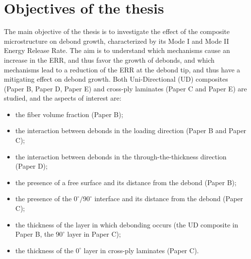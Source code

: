 \section{Objectives of the thesis}

The main objective of the thesis is to investigate the effect of the composite microstructure on debond growth, characterized by its Mode I and Mode II Energy Release Rate. The aim is to understand which mechanisms cause an increase in the ERR, and thus favor the growth of debonds, and which mechanisms lead to a reduction of the ERR at the debond tip, and thus have a mitigating effect on debond growth. Both Uni-Directional (UD) composites (Paper B, Paper D, Paper E) and cross-ply laminates (Paper C and Paper E) are studied, and the aspects of interest are:

\begin{itemize}
\item the fiber volume fraction (Paper B);
\item the interaction between debonds in the loading direction (Paper B and Paper C);
\item the interaction between debonds in the through-the-thickness direction (Paper D);
\item the presence of a free surface and its distance from the debond (Paper B);
\item the presence of the $0^{\circ}/90^{\circ}$ interface and its distance from the debond (Paper C);
\item the thickness of the layer in which debonding occurs (the UD composite in Paper B, the $90^{\circ}$ layer in Paper C);
\item the thickness of the $0^{\circ}$ layer in cross-ply laminates (Paper C).
\end{itemize}